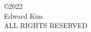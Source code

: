 
\begin{center}
\begin{singlespace}
\copyright 2022\\
Edward Kim \\
ALL RIGHTS RESERVED
\end{singlespace}
\end{center}

\clearpage
